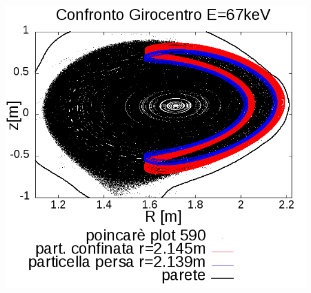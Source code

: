 \begin{frame}
\begin{columns}
\begin{column}{0.4\textwidth}
\begin{center}
		\includegraphics[scale=0.28]{Immagini/Simulazioni/Single/590/confronto_67_all.png}
		\end{center}
	\end{column}
\end{columns}
\end{frame}